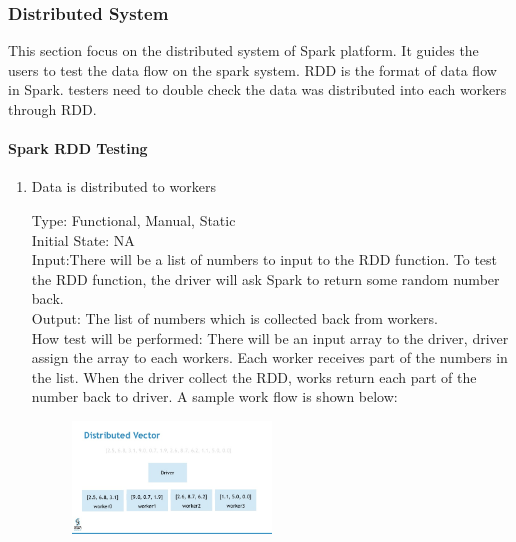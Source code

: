 \documentclass[12pt, titlepage]{article}
\begin{document}
\subsubsection{Distributed System}
This section focus on the distributed system of Spark platform. It guides the
users to test the data flow on the spark system. RDD is the format of data flow
in Spark. testers need to double check the data was distributed into each
workers through RDD.

\paragraph{ Spark RDD Testing}

\begin{enumerate}

\item{Data is distributed to workers\\}

Type: Functional, Manual, Static\\
Initial State: NA\\
Input:There will be a list of numbers to input to the RDD function. To test the RDD function, the driver will ask Spark to return some random number back. \\
Output: The list of numbers which is collected back from workers.\\
How test will be performed: There will be an input array to the driver, driver assign the array to each workers. Each worker receives part of the numbers in the list. When the driver collect the RDD, works return each part of the number back to driver. A sample work flow is shown below:
~\newline
\begin{figure}[h!]
\begin{center}
{
\includegraphics[width=0.5\textwidth]{sparkrdd.png}
}
\caption{\label{Input Data}}
\end{center}
\end{figure}

\end{enumerate}
\end{document}
